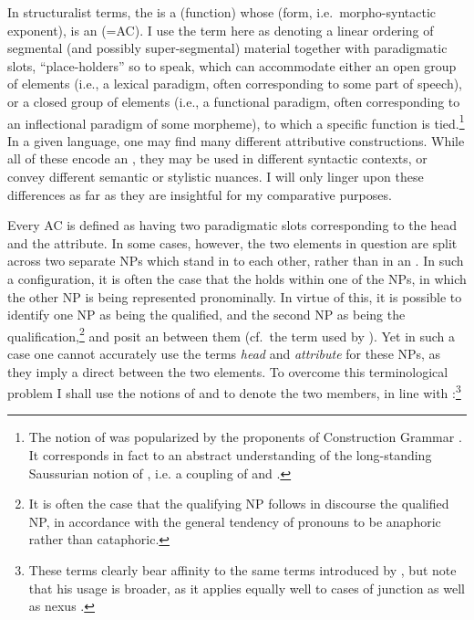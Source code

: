 In structuralist terms, the  is a  (function) whose  (form, i.e.\ morpho-syntactic exponent), is  an  (=AC).
 I use the term  here as denoting a linear ordering of segmental (and possibly super-segmental) material together with paradigmatic slots, \enquote{place-holders} so to speak, which can accommodate either an open group of elements (i.e., a lexical paradigm, often corresponding to some part of speech), or a closed group of elements (i.e., a functional paradigm, often corresponding to an inflectional paradigm of some morpheme), to which a specific function is tied.\footnote{The notion of  was popularized by the proponents of Construction Grammar \citep[e.g.][]{GoldbergConstructions,CroftRadical}. It corresponds in fact to an abstract understanding of the long-standing Saussurian notion of , i.e. a coupling of  and .} In a given language, one may find many different attributive constructions. While all of these encode an , they may be  used in different syntactic contexts, or convey different semantic or stylistic nuances. I will only linger upon these differences as far as they are insightful for my comparative purposes. 

Every AC is defined as having two paradigmatic slots corresponding to the head and the attribute. In some cases, however, the two elements in question are split across two separate NPs which stand in  to each other, rather than in an .   In such a configuration, it is often the case that the  holds within one of the NPs, in which the other NP is being represented pronominally. In virtue of this, it is possible to identify one NP as being the qualified, and the second NP as being the qualification,\footnote{It is often the case that the qualifying NP follows in discourse the qualified NP, in accordance with the general tendency of pronouns to be anaphoric rather than cataphoric.} and posit an  between them (cf.\ the term  used by \cite[79]{GoldenbergEarly}).
Yet  in such a case one cannot accurately use the terms \emph{head} and \emph{attribute} for these NPs, as they imply a direct  between the two elements. To overcome this terminological problem I shall use the notions of  and  to denote the two members, in line with \citet[38]{PlankIntro}:\footnote{These terms clearly bear affinity to the same terms introduced by \citeauthor{JespersenPhilosophy}, but note that his usage is broader, as it applies equally well to cases of junction as well as nexus \citep[97]{JespersenPhilosophy}.}

